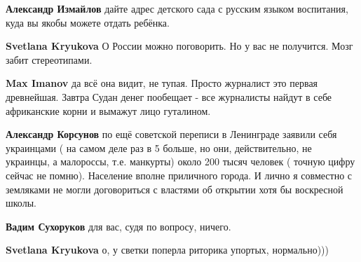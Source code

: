 \begin{itemize}
\begin{itemize}
\textbf{Александр Измайлов} дайте адрес детского сада с русским языком воспитания, куда вы якобы можете отдать ребёнка.

 
\textbf{Svetlana Kryukova} О России можно поговорить. Но у вас не получится. Мозг забит стереотипами.

 
\textbf{Max Imanov} да всё она видит, не тупая. Просто журналист это первая древнейшая. Завтра Судан денег пообещает - все журналисты найдут в себе африканские корни и вымажут лицо гуталином.

 
\textbf{Александр Корсунов} по ещё советской переписи в Ленинграде заявили себя украинцами ( на самом деле раз в 5 больше, но они, действительно, не украинцы, а малороссы, т.е. манкурты) около 200 тысяч человек ( точную цифру сейчас не помню). Население вполне приличного города. И лично я совместно с земляками не могли договориться с властями об открытии хотя бы воскресной школы.

 
\textbf{Вадим Сухоруков} для вас, судя по вопросу, ничего.

 
\textbf{Svetlana Kryukova} о, у светки поперла риторика упортых, нормально)))

 

\end{itemize}
\end{itemize}
